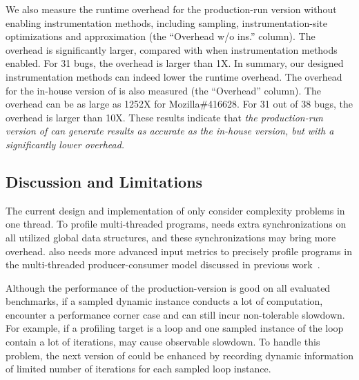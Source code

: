 We also measure the runtime overhead for the production-run 
version without enabling instrumentation methods, 
including sampling, instrumentation-site optimizations
and approximation (the ``Overhead w/o ins.'' column). 
The overhead is significantly larger, compared with when instrumentation methods enabled. 
For 31 bugs, the overhead is larger than 1X. 
In summary, our designed instrumentation methods can 
indeed lower the runtime overhead. 
The overhead for the in-house version 
of \Tool is also measured 
(the ``Overhead'' column). 
The overhead can be as large as 1252X for 
Mozilla\#416628.
For 31 out of 38 bugs, the overhead is larger than 10X. 
These results indicate that \emph{the 
production-run version of \Tool can generate results as accurate as the in-house version,
but with a significantly lower overhead. }


\subsection{Discussion and Limitations}

The current design and implementation of \Tool 
only consider complexity problems in one thread. 
To profile multi-threaded programs, 
\Tool needs extra synchronizations on all utilized global data structures, 
and these synchronizations may bring more overhead. 
\Tool also needs more advanced input metrics to precisely profile programs 
in the multi-threaded producer-consumer 
model discussed in previous work~\cite{Aprof2}. 

Although the performance of the production-version 
is good on all evaluated benchmarks, 
if a sampled dynamic instance conducts a lot of computation, 
\Tool encounter a performance corner case and can still incur non-tolerable slowdown.
For example, if a profiling target is a loop and 
one sampled instance of the loop contain a lot of iterations, 
\Tool may cause observable slowdown. 
To handle this problem, the next version of \Tool could 
be enhanced by recording dynamic information of limited number 
of iterations for each sampled loop instance. 



